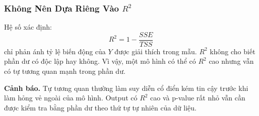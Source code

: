 \subsubsection{Không Nên Dựa Riêng Vào \texorpdfstring{$R^2$}{R2}}

Hệ số xác định:
\[
  R^2 = 1 - \frac{SSE}{TSS}
\]
chỉ phản ánh tỷ lệ biến động của $Y$ được giải thích trong mẫu. $R^2$ không cho biết phần dư có độc lập hay không. Vì vậy, một mô hình có thể có $R^2$ cao nhưng vẫn có tự tương quan mạnh trong phần dư.

\begin{warnbox}
\textbf{Cảnh báo.} Tự tương quan thường làm suy diễn cổ điển kém tin cậy trước khi làm hỏng vẻ ngoài của mô hình. Output có $R^2$ cao và p-value rất nhỏ vẫn cần được kiểm tra bằng phần dư theo thứ tự tự nhiên của dữ liệu.
\end{warnbox}

